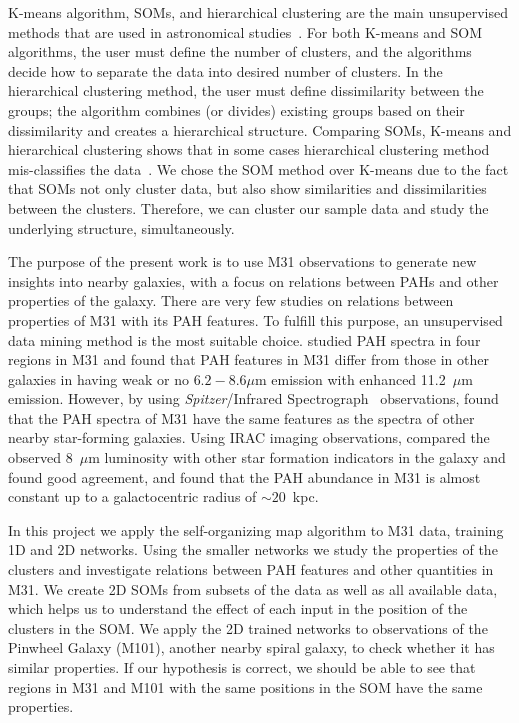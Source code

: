 K-means algorithm, SOMs, and hierarchical clustering are the main unsupervised methods that are used in astronomical studies~\citep[e.g.][]{DAbrusco12, Aycha16}. %
For both K-means and SOM algorithms, the user must define the number of clusters, and the algorithms decide how to separate the data into desired number of clusters.
In the hierarchical clustering method, the user must define dissimilarity between the groups; the algorithm combines (or divides) existing groups based on their dissimilarity and creates a hierarchical structure. 
Comparing SOMs, K-means and hierarchical clustering shows that in some cases hierarchical clustering method mis-classifies the data~\citep[][and references therein]{Mangiameli96}.
We chose the SOM method over K-means due to the fact that SOMs not only cluster data, but also show similarities and dissimilarities between the clusters.
Therefore, we can cluster our sample data and study the underlying structure, simultaneously.

The purpose of the present work is to use M31 observations to generate new insights into nearby galaxies, with a focus on relations between PAHs and other properties of the galaxy.
There are very few studies on relations between properties of M31 with its PAH features.
To fulfill this purpose, an unsupervised data mining method is the most suitable choice.
\cite{Cesarsky98} studied PAH spectra in four regions in M31 and found that PAH features in M31 differ from those in other galaxies in having weak or no $6.2 - 8.6\mu$m emission with enhanced 11.2~$\mu$m emission. 
However, \cite{Dim15} by using {\it Spitzer}/Infrared Spectrograph~\citep[IRS,][]{Houck04b} observations, found that the PAH spectra of M31 have the same features as the spectra of other nearby star-forming galaxies.
Using IRAC imaging observations,\cite{Barmby06} compared the observed 8~$\mu$m luminosity with other star formation indicators in the galaxy and found good agreement, and \cite{Draine14} found that the PAH abundance in M31 is almost constant up to a galactocentric radius of $\sim 20$~kpc.


In this project we apply the self-organizing map algorithm to M31 data, training 1D and 2D networks.
Using the smaller networks we study the properties of the clusters and investigate relations between PAH features and other quantities in M31.
We create 2D SOMs from subsets of the data as well as all available data, which helps us to understand the effect of each input in the position of the clusters in the SOM.
We apply the 2D trained networks to  observations of the Pinwheel Galaxy (M101), another nearby spiral  galaxy, to check whether it has similar properties.
If our hypothesis is correct, we should be able to see that regions in M31 and M101 with the same positions in the SOM have the same properties.

